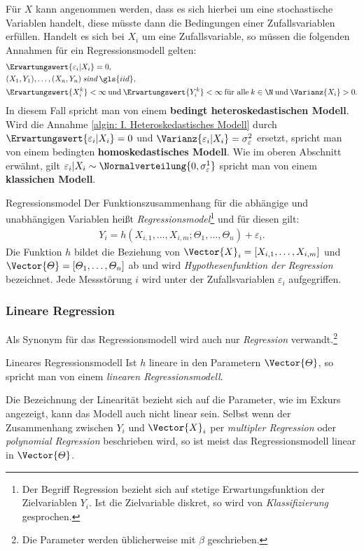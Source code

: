 Für $X$ kann angenommen werden, dass es sich hierbei um eine stochastische Variablen handelt, diese müsste dann die Bedingungen einer Zufallsvariablen erfüllen. Handelt es sich bei $X_i$ um eine Zufallsvariable, so müssen die folgenden Annahmen für ein Regressionsmodell gelten:
\begin{align}
	&\Erwartungswert{\varepsilon_i| X_i} = 0, \label{algin: I. Heteroskedastisches Modell}\\
	&(X_1, Y_1), \dots, (X_n, Y_n)\:\textit{sind}\:\gls{iid},\\
	&\Erwartungswert{X_i^k}<\infty\:\text{und}\:\Erwartungswert{Y_i^k}<\infty\:\text{für alle}\:k\in \N\:\text{und}\:\Varianz{X_i}>0.
\end{align}
In diesem Fall spricht man von einem \textbf{bedingt heteroskedastischen Modell}. Wird die Annahme \ref{algin: I. Heteroskedastisches Modell} durch $\Erwartungswert{\varepsilon_i|X_i} = 0$ und $\Varianz{\varepsilon_i|X_i}=\sigma_\varepsilon^2$ ersetzt, spricht man von einem bedingten \textbf{homoskedastisches Modell}. Wie im oberen Abschnitt erwähnt, gilt $\varepsilon_i|X_i\sim\Normalverteilung{0, \sigma_\varepsilon^1}$ spricht man von einem \textbf{klassichen Modell}.

\begin{Definition}{Regressionsmodel}
	Der Funktionszusammenhang für die abhängige und unabhängigen Variablen heißt \textit{Regressionsmodel}\footnote{Der Begriff Regression bezieht sich auf stetige Erwartungsfunktion der Zielvariablen $Y_i$. Ist die Zielvariable diskret, so wird von \textit{Klassifizierung} gesprochen.} und für diesen gilt:
	\begin{align}
		Y_i = h\left(X_{i,1}, \dots, X_{i,m}; \varTheta_1, \dots, \varTheta_n\right) + \varepsilon_i.
	\end{align}
	Die Funktion $h$ bildet die Beziehung von $\Vector{X}_i=\left[X_{i,1}, \dots, X_{i,m}\right]$ und $\Vector{\varTheta}= \left[\varTheta_1, \dots, \varTheta_n\right]$ ab und wird \textit{Hypothesenfunktion der Regression} bezeichnet. Jede Messstörung $i$ wird unter der Zufallsvariablen $\varepsilon_i$ aufgegriffen.
\end{Definition}



\subsubsection{Lineare Regression}
Als Synonym für das Regressionsmodell wird auch nur \textit{Regression} verwandt.\footnote{Die Parameter werden üblicherweise mit $\beta$ geschrieben.}
\begin{Lemma-Definition}{Lineares Regressionsmodell}
	Ist $h$ lineare in den Parametern $\Vector{\varTheta}$, so spricht man von einem \textit{linearen Regressionsmodell}.
\end{Lemma-Definition}
Die Bezeichnung der Linearität bezieht sich auf die Parameter, wie im Exkurs angezeigt, kann das Modell auch nicht linear sein. Selbst wenn der Zusammenhang zwischen $Y_i$ und $\Vector{X}_i$ per \textit{multipler Regression} oder \textit{polynomial Regression} beschrieben wird, so ist meist das Regressionsmodell linear in $\Vector{\varTheta}$.

